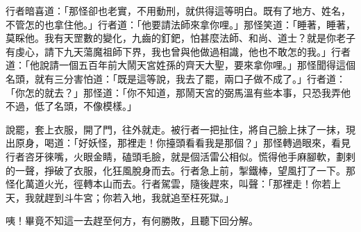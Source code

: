 行者暗喜道：「那怪卻也老實，不用動刑，就供得這等明白。既有了地方、姓名，不管怎的也拿住他。」行者道：「他要請法師來拿你哩。」那怪笑道：「睡著，睡著，莫睬他。我有天罡數的變化，九齒的釘鈀，怕甚麼法師、和尚、道士？就是你老子有虔心，請下九天蕩魔祖師下界，我也曾與他做過相識，他也不敢怎的我。」行者道：「他說請一個五百年前大鬧天宮姓孫的齊天大聖，要來拿你哩。」那怪聞得這個名頭，就有三分害怕道：「既是這等說，我去了罷，兩口子做不成了。」行者道：「你怎的就去？」那怪道：「你不知道，那鬧天宮的弼馬溫有些本事，只恐我弄他不過，低了名頭，不像模樣。」

說罷，套上衣服，開了門，往外就走。被行者一把扯住，將自己臉上抹了一抹，現出原身，喝道：「好妖怪，那裡走！你擡頭看看我是那個？」那怪轉過眼來，看見行者咨牙徠嘴，火眼金睛，磕頭毛臉，就是個活雷公相似。慌得他手麻腳軟，劃剌的一聲，掙破了衣服，化狂風脫身而去。行者急上前，掣鐵棒，望風打了一下。那怪化萬道火光，徑轉本山而去。行者駕雲，隨後趕來，叫聲：「那裡走！你若上天，我就趕到斗牛宮；你若入地，我就追至枉死獄。」

咦！畢竟不知這一去趕至何方，有何勝敗，且聽下回分解。
